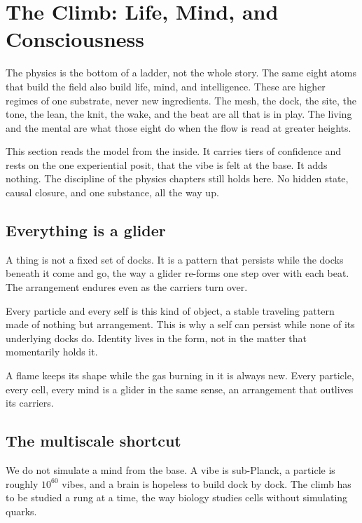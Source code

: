 \section{The Climb: Life, Mind, and Consciousness}

The physics is the bottom of a ladder, not the whole story. The same eight atoms that build the field also build life, mind, and intelligence. These are higher regimes of one substrate, never new ingredients. The mesh, the dock, the site, the tone, the lean, the knit, the wake, and the beat are all that is in play. The living and the mental are what those eight do when the flow is read at greater heights.

This section reads the model from the inside. It carries tiers of confidence and rests on the one experiential posit, that the vibe is felt at the base. It adds nothing. The discipline of the physics chapters still holds here. No hidden state, causal closure, and one substance, all the way up.

\subsection{Everything is a glider}

A thing is not a fixed set of docks. It is a pattern that persists while the docks beneath it come and go, the way a glider re-forms one step over with each beat. The arrangement endures even as the carriers turn over.

Every particle and every self is this kind of object, a stable traveling pattern made of nothing but arrangement. This is why a self can persist while none of its underlying docks do. Identity lives in the form, not in the matter that momentarily holds it.

\begin{principle}
A flame keeps its shape while the gas burning in it is always new. Every particle, every cell, every mind is a glider in the same sense, an arrangement that outlives its carriers.
\end{principle}

\subsection{The multiscale shortcut}

We do not simulate a mind from the base. A vibe is sub-Planck, a particle is roughly $10^{60}$ vibes, and a brain is hopeless to build dock by dock. The climb has to be studied a rung at a time, the way biology studies cells without simulating quarks.

